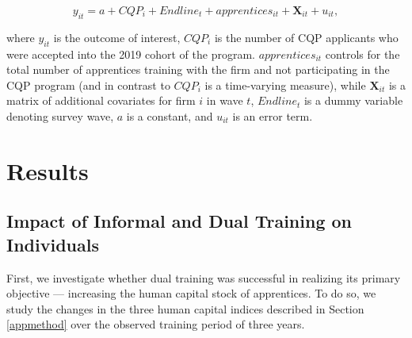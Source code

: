 \documentclass[
  a4paper, twoside, 12pt]{book}
\begin{document}
\[ y_{it} =  a+CQP_i+{Endline}_t+apprentices_{it}+\mathbf{X}_{it}+u_{it}, \]

where \(y_{it}\) is the outcome of interest, \(CQP_i\) is the number of CQP applicants who were accepted into the 2019 cohort of the program. \(apprentices_{it}\) controls for the total number of apprentices training with the firm and not participating in the CQP program (and in contrast to \(CQP_i\) is a time-varying measure), while \(\mathbf{X}_{it}\) is a matrix of additional covariates for firm \(i\) in wave \(t\), \({Endline}_t\) is a dummy variable denoting survey wave, \(a\) is a constant, and \(u_{it}\) is an error term.

\hypertarget{cqpresults}{%
\section{Results}\label{cqpresults}}

\hypertarget{appbenefits}{%
\subsection{Impact of Informal and Dual Training on Individuals}\label{appbenefits}}

First, we investigate whether dual training was successful in realizing its primary objective --- increasing the human capital stock of apprentices. To do so, we study the changes in the three human capital indices described in Section \ref{appmethod} over the observed training period of three years.
\end{document}
